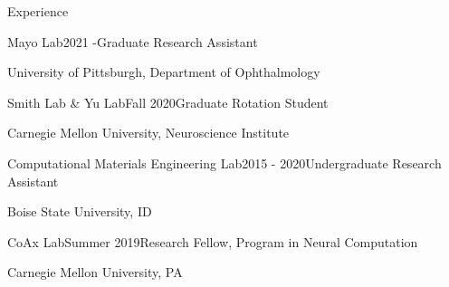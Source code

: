 \documentclass{resume} %
\begin{document}
\begin{rSection}{Experience}

\begin{rSubsection}{Mayo Lab}{2021 -}{Graduate Research Assistant}{}
\item University of Pittsburgh, Department of Ophthalmology
\end{rSubsection}


\begin{rSubsection}{Smith Lab \& Yu Lab}{Fall 2020}{Graduate Rotation Student}{}
\item Carnegie Mellon University, Neuroscience Institute
\end{rSubsection}


\begin{rSubsection}{Computational Materials Engineering Lab}{2015 - 2020}{Undergraduate Research Assistant}{}
\item Boise State University, ID
\end{rSubsection}


\begin{rSubsection}{CoAx Lab}{Summer 2019}{Research Fellow, Program in Neural Computation}{}
\item Carnegie Mellon University, PA
\end{rSubsection}


\end{rSection}
\end{document}
